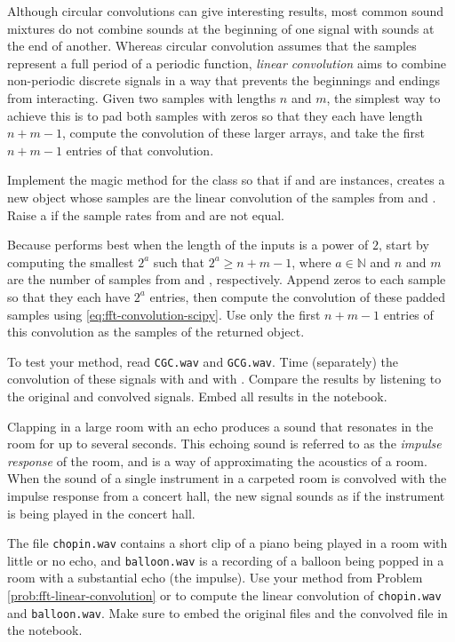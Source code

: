 Although circular convolutions can give interesting results, most common sound mixtures do not combine sounds at the beginning of one signal with sounds at the end of another.
Whereas circular convolution assumes that the samples represent a full period of a periodic function, \emph{linear convolution} aims to combine non-periodic discrete signals in a way that prevents the beginnings and endings from interacting.
Given two samples with lengths $n$ and $m$, the simplest way to achieve this is to pad both samples with zeros so that they each have length $n+m-1$, compute the convolution of these larger arrays, and take the first $n+m-1$ entries of that convolution.

\begin{problem} %
\item Implement the  magic method for the  class so that if  and  are  instances,  creates a new  object whose samples are the linear convolution of the samples from  and .
Raise a  if the sample rates from  and  are not equal.

Because  performs best when the length of the inputs is a power of $2$, start by computing the smallest $2^a$ such that $2^a \ge n + m - 1$, where $a\in\mathbb{N}$ and $n$ and $m$ are the number of samples from  and , respectively.
Append zeros to each sample so that they each have $2^a$ entries, then compute the convolution of these padded samples using \eqref{eq:fft-convolution-scipy}.
Use only the first $n + m - 1$ entries of this convolution as the samples of the returned  object.

To test your method, read \texttt{CGC.wav} and \texttt{GCG.wav}.
Time (separately) the convolution of these signals with  and with .
Compare the results by listening to the original and convolved signals. Embed all results in the notebook.
\label{prob:fft-linear-convolution}
\end{problem}

\begin{problem} %
Clapping in a large room with an echo produces a sound that resonates in the room for up to several seconds.
This echoing sound is referred to as the \emph{impulse response} of the room, and is a way of approximating the acoustics of a room.
When the sound of a single instrument in a carpeted room is convolved with the impulse response from a concert hall, the new signal sounds as if the instrument is being played in the concert hall.

The file \texttt{chopin.wav} contains a short clip of a piano being played in a room with little or no echo, and \texttt{balloon.wav} is a recording of a balloon being popped in a room with a substantial echo (the impulse).
Use your method from Problem \ref{prob:fft-linear-convolution} or  to compute the linear convolution of \texttt{chopin.wav} and \texttt{balloon.wav}.
Make sure to embed the original files and the convolved file in the notebook.
\end{problem}

